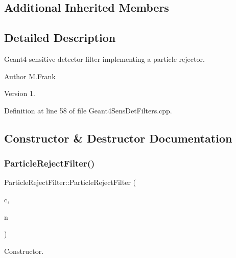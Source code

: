 \subsection*{Additional Inherited Members}


\subsection{Detailed Description}
Geant4 sensitive detector filter implementing a particle rejector. 

\begin{DoxyAuthor}{Author}
M.\+Frank 
\end{DoxyAuthor}
\begin{DoxyVersion}{Version}
1. 
\end{DoxyVersion}


Definition at line 58 of file Geant4\+Sens\+Det\+Filters.\+cpp.



\subsection{Constructor \& Destructor Documentation}
\hypertarget{struct_d_d4hep_1_1_simulation_1_1_particle_reject_filter_aa06fb54a0ef772c1de13df2c32942adb}{}\label{struct_d_d4hep_1_1_simulation_1_1_particle_reject_filter_aa06fb54a0ef772c1de13df2c32942adb} 
\subsubsection{\texorpdfstring{Particle\+Reject\+Filter()}{ParticleRejectFilter()}}
{\footnotesize\ttfamily Particle\+Reject\+Filter\+::\+Particle\+Reject\+Filter (\begin{DoxyParamCaption}\item[{\hyperlink{class_d_d4hep_1_1_simulation_1_1_geant4_context}{Geant4\+Context} $\ast$}]{c,  }\item[{const std\+::string \&}]{n }\end{DoxyParamCaption})}



Constructor. 



